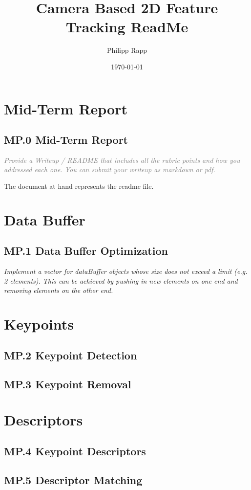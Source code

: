 \documentclass[a4paper]{scrartcl}
\title{Camera Based 2D Feature Tracking ReadMe}
\author{Philipp Rapp}
\date{\today}
\begin{document}
\maketitle

\section*{Mid-Term Report}
\subsection*{MP.0 Mid-Term Report}
\textcolor{gray}{\textit{Provide a Writeup / README that includes all the rubric points and how you addressed each one. You can submit your writeup as markdown or pdf.}}

The document at hand represents the readme file.

\section*{Data Buffer}
\subsection*{MP.1 Data Buffer Optimization}
\textit{Implement a vector for dataBuffer objects whose size does not exceed a limit (e.g. 2 elements). This can be achieved by pushing in new elements on one end and removing elements on the other end.}

\section*{Keypoints}
\subsection*{MP.2 Keypoint Detection}
\subsection*{MP.3 Keypoint Removal}

\section*{Descriptors}
\subsection*{MP.4 Keypoint Descriptors}
\subsection*{MP.5 Descriptor Matching}
\end{document}
